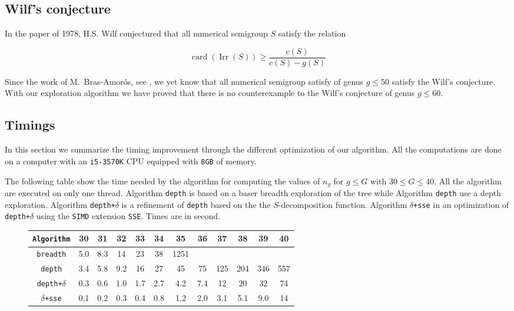 \documentclass[reqno,11pt]{amsart}
\theoremstyle{plain}
\theoremstyle{definition}
\renewcommand{\leq}{\leqslant}
\renewcommand{\geq}{\geqslant}
\newcommand{\SIMD}{\texttt{SIMD}\xspace}
\newcommand{\SSE}{\texttt{SSE}\xspace}
\renewcommand{\tt}[1]{\texttt{#1}}
\DeclareMathOperator{\Irr}{Irr}
\DeclareMathOperator{\card}{card}
\begin{document}
\subsection{Wilf's conjecture}

In the paper \cite{Wilf} of 1978, H.S. Wilf conjectured that all numerical semigroup $S$ satisfy the relation 

\[
\card(\Irr(S))\geq \frac{c(S)}{c(S)-g(S)}
\]

Since the work of M.~Bras-Amor{\'o}s, see \cite{BrasAmoros2008}, we yet know that all numerical semigroup satisfy of genus $g\leq 50$ satisfy the Wilf's conjecture. With our exploration algorithm we have proved that there is no counterexample to the Wilf's conjecture of genus $g\leq 60$.


\subsection{Timings}

In this section we summarize the timing improvement through the different optimization of our algorithm. All the computations are done on a computer with an \tt{i5-3570K} CPU equipped with \texttt{8GB} of memory.

The following table show the time needed by the algorithm for computing the values of $n_g$ for $g\leq G$ with $30\leq G \leq 40$.
All the algorithm are executed on only one thread. Algorithm \texttt{depth} is based on a baser breadth exploration of the tree while Algorithm \texttt{depth} use a depth exploration. Algorithm \texttt{depth+$\delta$} is a refinement of \texttt{depth} based on the the $S$-decomposition function. Algorithm \texttt{$\delta$+sse} in an optimization of \texttt{depth+$\delta$} using the \SIMD extension \SSE. Times are in second.

\begin{figure}[h!]
\begin{tabular}{|c|c|c|c|c|c|c|c|c|c|c|c|}
\hline
\texttt{Algorithm}					&  30 &  31 &  32 &  33 &  34 &   35 &  36 &  37 &  38 &  39 &  40 \\
\hline
\texttt{breadth}		& 5.0 & 8.3 &  14 &  23 &  38 & 1251 &     &     &     &     &     \\
\texttt{depth}			& 3.4 & 5.8 & 9.2 &  16 &  27 &   45 &  75 & 125 & 204 & 346 & 557 \\
\texttt{depth+$\delta$}	& 0.3 & 0.6 & 1.0 & 1.7 & 2.7 &  4.2 & 7.4 &  12 &  20 &  32 & 74  \\
\texttt{$\delta$+sse}	& 0.1 & 0.2 & 0.3 & 0.4 & 0.8 &  1.2 & 2.0 & 3.1 & 5.1 & 9.0 & 14 \\
\hline
\end{tabular}
\end{figure}
\end{document}
